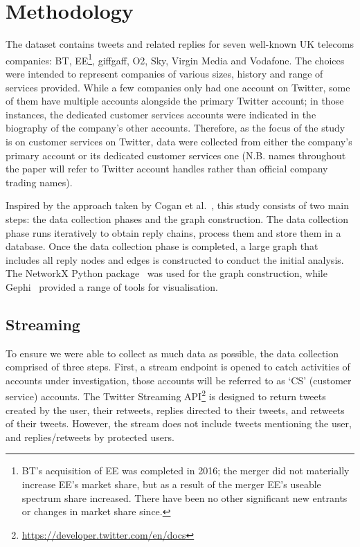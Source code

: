 \documentclass[sigconf]{acmart}
\begin{document}
\section{Methodology}\label{method}

The dataset contains tweets and related replies for seven well-known
UK telecoms companies: BT, EE\footnote{BT's acquisition of EE was
completed in 2016; the merger did not materially increase EE's market
share, but as a result of the merger EE's useable spectrum share
increased. There have been no other significant new entrants or
changes in market share since.}, giffgaff, O2, Sky, Virgin Media and
Vodafone. The choices were intended to represent companies of various
sizes, history and range of services provided. While a few companies
only had one account on Twitter, some of them have multiple
accounts alongside the primary Twitter account; in those instances,
the dedicated customer services accounts were indicated in the
biography of the company's other accounts. Therefore, as the focus of
the study is on customer services on Twitter, data were collected from
either the company's primary account or its dedicated customer services
one (N.B. names throughout the paper will refer to Twitter account handles
rather than official company trading names).

Inspired by the approach taken by Cogan et al.~\cite{Cogan2012}, this
study consists of two main steps: the data collection phases and the
graph construction. The data collection phase runs iteratively to obtain
reply chains, process them and store them in a database. Once the data
collection phase is completed, a large graph that includes all reply
nodes and edges is constructed to conduct the initial analysis. The
NetworkX Python package~\cite{Hagberg2008} was used for the graph
construction, while Gephi~\cite{Bastian2009} provided a range of tools
for visualisation.


\subsection{Streaming}

To ensure we were able to collect as much data as possible, the data
collection comprised of three steps. First, a stream endpoint is
opened to catch activities of accounts under investigation, those
accounts will be referred to as `CS' (customer service)
accounts. The Twitter Streaming
API\footnote{\url{https://developer.twitter.com/en/docs}} is designed
to return tweets created by the user, their retweets, replies directed
to their tweets, and retweets of their tweets. However, the stream
does not include tweets mentioning the user, and replies/retweets by
protected users.
\end{document}

